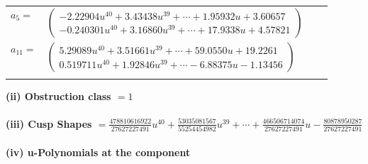 \documentclass[1p]{elsarticle_modified}
\theoremstyle{definition}
\begin{document}
\begin{tabular}{m{7pt} m{180pt} m{7pt} m{180pt} }
\flushright $a_{5}=$&$\begin{pmatrix}-2.22904 u^{40}+3.43438 u^{39}+\cdots+1.95932 u+3.60657\\-0.240301 u^{40}+3.16860 u^{39}+\cdots+17.9338 u+4.57821\end{pmatrix}$ \\
\flushright $a_{11}=$&$\begin{pmatrix}5.29089 u^{40}+3.51661 u^{39}+\cdots+59.0550 u+19.2261\\0.519711 u^{40}+1.92846 u^{39}+\cdots-6.88375 u-1.13456\end{pmatrix}$\\&\end{tabular}
\flushleft \textbf{(ii) Obstruction class $= 1$}\\~\\
\flushleft \textbf{(iii) Cusp Shapes $= \frac{478810616922}{27627227491} u^{40}+\frac{53035081567}{55254454982} u^{39}+\cdots+\frac{466506714074}{27627227491} u-\frac{80878950287}{27627227491}$}\\~\\
\newpage\renewcommand{\arraystretch}{1}
\flushleft \textbf{(iv) u-Polynomials at the component}\newline \\
\end{document}
